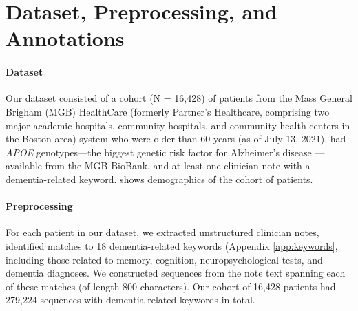 \documentclass[pmlr,twocolumn,10pt]{jmlr} %
\begin{document}
\section{Dataset, Preprocessing, and Annotations}
\label{sec:Dataset+Preprocessing+Annotations}

\paragraph{Dataset}
\label{sec:Dataset} Our dataset consisted of a cohort (N = 16,428) of patients from the Mass General Brigham (MGB) HealthCare  (formerly Partner's Healthcare, comprising two major academic hospitals, community hospitals, and community health centers in the Boston area) system who were older than 60 years (as of July 13, 2021), had \textit{APOE} genotypes—the biggest genetic risk factor for Alzheimer's disease  \citep{mahley2000apolipoprotein}—available from the MGB BioBank, and at least one clinician note with a dementia-related keyword.  shows demographics of the cohort of patients.   

\paragraph{Preprocessing}
\label{sec:Preprocessing} For each patient in our dataset, we extracted unstructured clinician notes, identified matches to 18 dementia-related keywords (Appendix \ref{app:keywords}, including those related to memory, cognition, neuropsychological tests, and dementia diagnoses. We constructed sequences from the note text spanning each of these matches (of length 800 characters). Our cohort of 16,428 patients had 279,224 sequences with dementia-related keywords in total.
\end{document}
